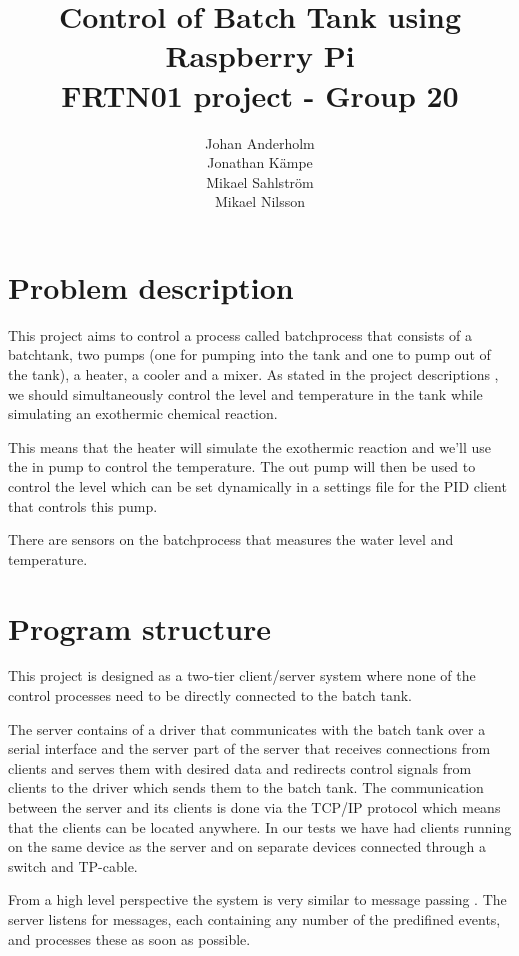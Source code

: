 \documentclass{article}
\title{Control of Batch Tank using Raspberry Pi \\ FRTN01 project - Group 20}
\date{}
\author{Johan Anderholm \\ Jonathan Kämpe \\ Mikael Sahlström \\ Mikael Nilsson}
\begin{document}
\maketitle
\newpage
\tableofcontents
\newpage
\section{Problem description}
This project aims to control a process called batchprocess that consists of a
batchtank, two pumps (one for pumping into the tank and one to pump out of the
tank), a heater, a cooler and a mixer. As stated in the project descriptions
\cite[p.~6]{project12}, we should simultaneously control the level and
temperature in the tank while simulating an exothermic chemical reaction.

This means that the heater will simulate the exothermic reaction and we'll use
the in pump to control the temperature. The out pump will then be used
to control the level which can be set dynamically in a settings file for the PID client that controls this pump.

There are sensors on the batchprocess that measures the water level and temperature.

\section{Program structure}
This project is designed as a two-tier client/server system 
\cite[p.~6]{clientserver} where none of the control processes need to be directly
connected to the batch tank.

The server contains of a driver that communicates with the batch tank over a
serial interface and the server part of the server that receives connections from
clients and serves them with desired data and redirects control signals from
clients to the driver which sends them to the batch tank. The communication
between the server and its clients is done via the TCP/IP protocol which means
that the clients can be located anywhere. In our tests we have had clients
running on the same device as the server and on separate devices connected
through a switch and TP-cable.

From a high level perspective the system is very similar to message
passing \cite[p.~71]{rtcs}. The server listens for messages, each
containing any number of the predifined events, and processes these as
soon as possible.
\end{document}
